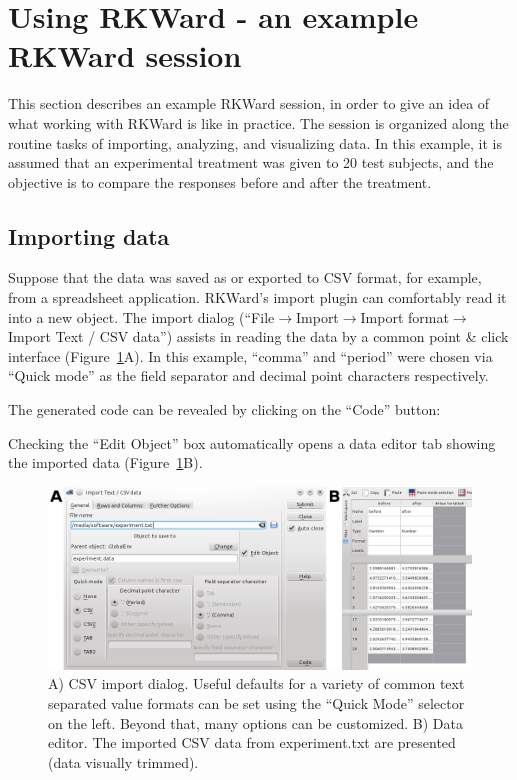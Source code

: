 \section{Using RKWard - an example RKWard session}
\label{sec:using_RKWard}
This section describes an example RKWard session, in order to give an idea
of what working with RKWard is like in practice.
The session is organized along the routine tasks of importing,
analyzing, and visualizing data. In this example, it is assumed that an experimental
treatment was given to 20 test subjects, and the objective is to compare the responses
before and after the treatment. 

\subsection{Importing data}
\label{sec:importing_data}
Suppose that the data was saved as or exported to CSV format, for example, from a
spreadsheet application. RKWard's import plugin can
comfortably read it into a new  object.
The import dialog (``File$\rightarrow$Import$\rightarrow$Import
format$\rightarrow$Import Text / CSV data'') assists in reading the
data by a common point \& click interface (Figure~\ref{fig:import_data}A). In this
example, ``comma'' and ``period'' were chosen via ``Quick mode'' as the field
separator and decimal point characters respectively.

The generated  code can be revealed by clicking on the ``Code'' button:



Checking the ``Edit Object'' box automatically opens a data editor tab
showing the imported data (Figure~\ref{fig:import_data}B).

\begin{figure}[htp]
 \centering
 \includegraphics[width=15.5cm]{../figures/import_data.png}
 \caption{A) CSV import dialog. Useful defaults for a variety of common text separated value formats can
  be set using the ``Quick Mode'' selector on the left. Beyond that, many options can be customized. B) Data editor. The imported CSV
  data from experiment.txt are presented (data visually trimmed).}
 \label{fig:import_data}
\end{figure}

